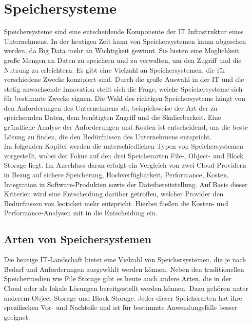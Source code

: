 \chapter{Speichersysteme}

Speichersysteme sind eine entscheidende Komponente der IT Infrastruktur eines Unternehmens. In der heutigen Zeit kann von Speichersystemen kaum abgesehen werden, da Big Data mehr an Wichtigkeit gewinnt. Sie bieten eine Möglichkeit, große Mengen an Daten zu speichern und zu verwalten, um den Zugriff und die Nutzung zu erleichtern. Es gibt eine Vielzahl an Speichersystemen, die für verschiedene Zwecke konzipiert sind. Durch die große Auswahl in der IT und die stetig anwachsende Innovation stellt sich die Frage, welche Speichersysteme sich für bestimmte Zwecke eignen. Die Wahl des richtigen Speichersystems hängt von den Anforderungen des Unternehmens ab, beispielsweise der Art der zu speichernden Daten, dem benötigten Zugriff und die Skalierbarkeit. Eine gründliche Analyse der Anforderungen und Kosten ist entscheidend, um die beste Lösung zu finden, die den Bedürfnissen des Unternehmens entspricht.\\

Im folgenden Kapitel werden die unterschiedlichen Typen von Speichersystemen vorgestellt, wobei der Fokus auf den drei Speicherarten File-, Object- und Block Storage liegt. Im Anschluss daran erfolgt ein Vergleich von zwei Cloud-Providern in Bezug auf sichere Speicherung, Hochverfügbarkeit, Performance, Kosten, Integration in Software-Produkten sowie der Dateibereitstellung. Auf Basis dieser Kriterien wird eine Entscheidung darüber getroffen, welcher Provider den Bedürfnissen von leoticket mehr entspricht. Hierbei fließen die Kosten- und Performance-Analysen mit in die Entscheidung ein.

\newpage

\section{Arten von Speichersystemen}
 
Die heutige IT-Landschaft bietet eine Vielzahl von Speichersystemen, die je nach Bedarf und Anforderungen ausgewählt werden können. Neben den traditionellen Speichermedien wie File Storage gibt es heute auch andere Arten, die in der Cloud oder als lokale Lösungen bereitgestellt werden können. Dazu gehören unter anderem Object Storage und Block Storage. Jeder dieser Speicherarten hat ihre spezifischen Vor- und Nachteile und ist für bestimmte Anwendungsfälle besser geeignet. 
 

